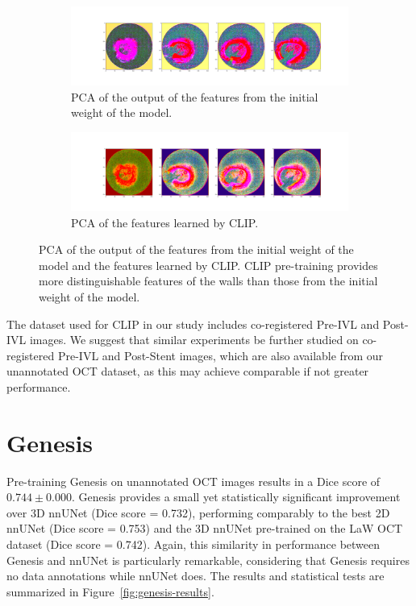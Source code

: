 \documentclass[a4paper,11pt,oneside]{report}
\begin{document}
\begin{figure}[h]
    \centering
    \begin{subfigure}[t]{0.5\textwidth}
        \centering
        \includegraphics[width=\linewidth]{figures/discussion_default_feature_map_batch0_feature1.png}
        \caption{PCA of the output of the features from the initial weight of the model.}
        \label{fig:pca-initial}
    \end{subfigure}%
    \begin{subfigure}[t]{0.5\textwidth}
        \centering
        \includegraphics[width=\linewidth]{figures/discussion_clip_feature_map_batch0_feature1.png}
        \caption{PCA of the features learned by CLIP.}
        \label{fig:pca-clip}
        
    \end{subfigure}
    \caption{PCA of the output of the features from the initial weight of the model and the features learned by CLIP. CLIP pre-training provides more distinguishable features of the walls than those from the initial weight of the model. 
    }
\end{figure}

The dataset used for CLIP in our study includes co-registered Pre-IVL and Post-IVL images. We suggest that similar experiments be further studied on co-registered Pre-IVL and Post-Stent images, which are also available from our unannotated OCT dataset, as this may achieve comparable if not greater performance.

\section{Genesis}
Pre-training Genesis on unannotated OCT images results in a Dice score of $0.744\pm0.000$. Genesis provides a small yet statistically significant improvement over 3D nnUNet (Dice score = 0.732), performing comparably to the best 2D nnUNet (Dice score = 0.753) and the 3D nnUNet pre-trained on the LaW OCT dataset (Dice score = 0.742). Again, this similarity in performance between Genesis and nnUNet is particularly remarkable, considering that Genesis requires no data annotations while nnUNet does. The results and statistical tests are summarized in Figure~\ref{fig:genesis-results}.
\end{document}

